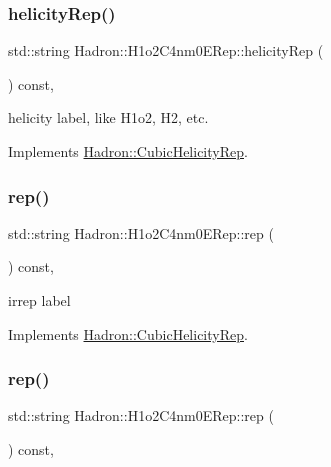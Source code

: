 \subsubsection{\texorpdfstring{helicityRep()}{helicityRep()}\hspace{0.1cm}{\footnotesize\ttfamily [3/3]}}
{\footnotesize\ttfamily std\+::string Hadron\+::\+H1o2\+C4nm0\+E\+Rep\+::helicity\+Rep (\begin{DoxyParamCaption}{ }\end{DoxyParamCaption}) const\hspace{0.3cm}{\ttfamily [inline]}, {\ttfamily [virtual]}}

helicity label, like H1o2, H2, etc. 

Implements \mbox{\hyperlink{structHadron_1_1CubicHelicityRep_af1096946b7470edf0a55451cc662f231}{Hadron\+::\+Cubic\+Helicity\+Rep}}.

\mbox{\label{structHadron_1_1H1o2C4nm0ERep_aec9bc604007b15cc42d00f7e75bba38a}} 
\subsubsection{\texorpdfstring{rep()}{rep()}\hspace{0.1cm}{\footnotesize\ttfamily [1/3]}}
{\footnotesize\ttfamily std\+::string Hadron\+::\+H1o2\+C4nm0\+E\+Rep\+::rep (\begin{DoxyParamCaption}{ }\end{DoxyParamCaption}) const\hspace{0.3cm}{\ttfamily [inline]}, {\ttfamily [virtual]}}

irrep label 

Implements \mbox{\hyperlink{structHadron_1_1CubicHelicityRep_a8cdd86f068a167dc96faef02bfb8a33d}{Hadron\+::\+Cubic\+Helicity\+Rep}}.

\mbox{\label{structHadron_1_1H1o2C4nm0ERep_aec9bc604007b15cc42d00f7e75bba38a}} 
\subsubsection{\texorpdfstring{rep()}{rep()}\hspace{0.1cm}{\footnotesize\ttfamily [2/3]}}
{\footnotesize\ttfamily std\+::string Hadron\+::\+H1o2\+C4nm0\+E\+Rep\+::rep (\begin{DoxyParamCaption}{ }\end{DoxyParamCaption}) const\hspace{0.3cm}{\ttfamily [inline]}, {\ttfamily [virtual]}}

